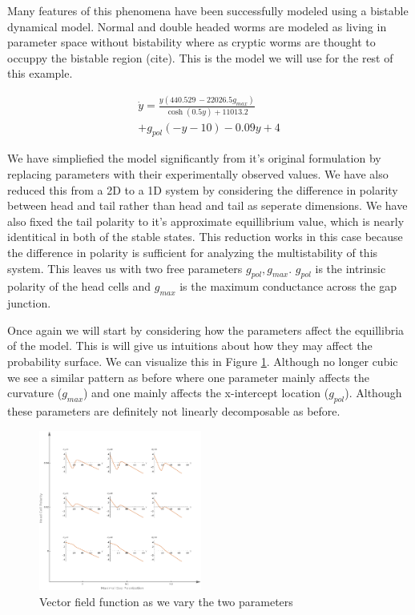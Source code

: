 \documentclass[letterpaper]{article}
\begin{document}
Many features of this phenomena have been successfully modeled using a bistable dynamical
model. Normal and double headed worms are modeled as living in parameter space without
bistability where as cryptic worms are thought to occuppy the bistable region (cite). 
This is the model we will use for the rest of this example.

\begin{equation}
  \begin{aligned}
  \dot{y} = \frac{y (440.529\, -22026.5 g_{max})}{\cosh (0.5 y)+11013.2}\\
  +g_{pol} (-y-10)-0.09 y+4
  \end{aligned}
\end{equation}

We have simpliefied the model significantly from it's original formulation by replacing
parameters with their experimentally observed values. We have also reduced this from a 
2D to a 1D system by considering the difference in polarity 
between head and tail rather
than head and tail as seperate dimensions. We have also fixed the tail polarity to
it's approximate equillibrium value, which is nearly identitical in both of the stable
states. 
This reduction works in this case 
because the difference
in polarity is sufficient for analyzing the multistability of this system.
This leaves us with two free parameters
$g_{pol},g_{max}$. $g_{pol}$ is the intrinsic polarity of the head cells
and $g_{max}$ is the maximum conductance across the gap junction.

Once again we will start by considering how the parameters affect the equillibria of
the model. This is will give us intuitions about how they may affect the probability
surface. We can visualize this in Figure \ref{fig7}. Although no longer cubic we 
see a similar pattern as before where one parameter mainly affects the curvature 
($g_{max}$)
and one mainly affects the x-intercept location ($g_{pol}$). 
Although these parameters are 
definitely not linearly decomposable as before.

\begin{figure}[t]
\begin{center}
\includegraphics[width=2.1in,angle=0]{./worm_params.png}
\caption{Vector field function as we vary the two parameters}
\label{fig7}
\end{center}
\end{figure}
\end{document}
